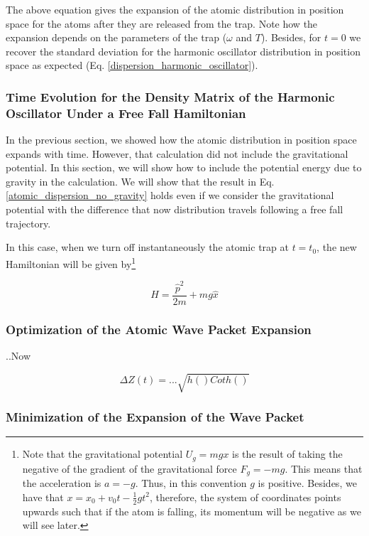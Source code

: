 \documentclass{article}
\begin{document}
The above equation gives the expansion of the atomic distribution in position space for the atoms after they are released from the trap. Note how the expansion depends on the parameters of the trap ($\omega$ and $T$). Besides, for $t=0$ we recover the standard deviation for the harmonic oscillator distribution in position space as expected (Eq. \ref{dispersion_harmonic_oscillator}).

\subsubsection{Time Evolution for the Density Matrix of the Harmonic Oscillator Under a Free Fall Hamiltonian}
In the previous section, we showed how the atomic distribution in position space expands with time. However, that calculation did not include the gravitational potential. In this section, we will show how to include the potential energy due to gravity in the calculation. We will show that the result in Eq. \ref{atomic_dispersion_no_gravity} holds even if we consider the gravitational potential with the difference that now distribution travels following a free fall trajectory.

In this case, when we turn off instantaneously the atomic trap at $t=t_{0}$, the new Hamiltonian will be given by\footnote{Note that the gravitational potential $U_{g}=mgx$ is the result of taking the negative of the gradient of the gravitational force $F_{g}=-mg$. This means that the acceleration is $a=-g$. Thus, in this convention $g$ is positive. Besides, we have that $x=x_{0}+v_{0}t-\frac{1}{2}gt^{2}$, therefore, the system of coordinates points upwards such that if the atom is falling, its momentum will be negative as we will see later.}

\begin{equation}
    H = \frac{\hat{p}^{2}}{2m} + mg\hat{x}
\end{equation}



\subsubsection{Optimization of the Atomic Wave Packet Expansion}
..Now

\begin{equation}
    \Delta Z(t) = ... \sqrt{h()Coth()}
\end{equation}

\subsubsection{Minimization of the Expansion of the Wave Packet}
\end{document}
